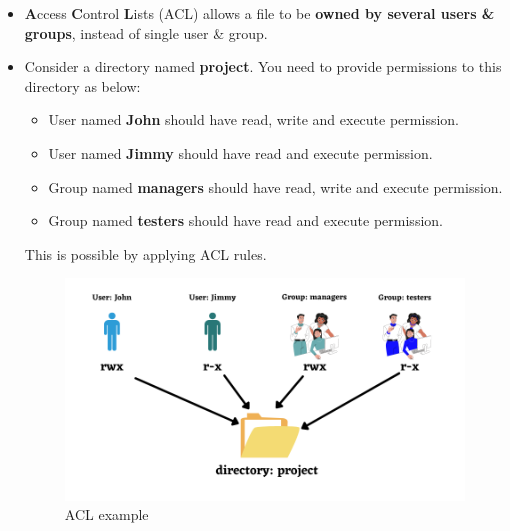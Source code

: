\setlength{\columnsep}{3pt}
\begin{flushleft}
	\bigskip
	\begin{itemize}
		\item \textbf{A}ccess \textbf{C}ontrol \textbf{L}ists (ACL) allows a file to be \textbf{owned by several users 
			\& groups}, instead of single user \& group.
		\item Consider a directory named \textbf{project}. You need to provide permissions to this directory as below:
		\begin{itemize}
			\item User named \textbf{John} should have read, write and execute permission.
			\item User named \textbf{Jimmy} should have read and execute permission.
			\item Group named \textbf{managers} should have read, write and execute permission.
			\item Group named \textbf{testers} should have read and execute permission.
		\end{itemize}
		\bigskip
		This is possible by applying ACL rules.
		\begin{figure}[h!]
			\centering
			\includegraphics[scale=0.6]{content/chapter6/images/acl.png}
			\caption{ACL example}
			\label{fig:acl_example}
		\end{figure}

		
		
		
	\end{itemize}

	
\end{flushleft}

\newpage

